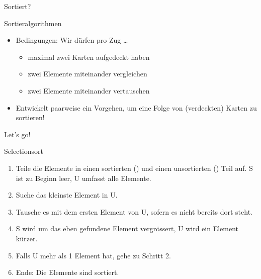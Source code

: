\begin{frame}{Sortiert?}
  \vspace*{6mm}
\end{frame}

\begin{frame}[text=large]{Sortieralgorithmen}
  \begin{itemize}
    \item Bedingungen: Wir dürfen pro Zug …
    \begin{itemize}
      \item maximal zwei Karten aufgedeckt haben
      \item zwei Elemente miteinander vergleichen
      \item zwei Elemente miteinander vertauschen
    \end{itemize}
    \item Entwickelt paarweise ein Vorgehen, um eine Folge von (verdeckten) Karten zu sortieren!
  \end{itemize}
\end{frame}

\begin{frame}[doit={zu zweit}]{Let's go!}
  \vspace*{8mm}
\end{frame}


\begin{frame}[text=small]{Selectionsort}
  \begin{enumerate}
    \item Teile die Elemente in einen sortierten () und einen unsortierten () Teil auf.
      S ist zu Beginn leer, U umfasst alle Elemente.
    \item Suche das kleinste Element in U.
    \item Tausche es mit dem ersten Element von U, sofern es nicht bereits dort steht.
    \item S wird um das eben gefundene Element vergrössert, U wird ein Element kürzer.
    \item Falls U mehr als 1 Element hat, gehe zu Schritt 2.
    \item Ende: Die Elemente sind sortiert.
  \end{enumerate}
\end{frame}

